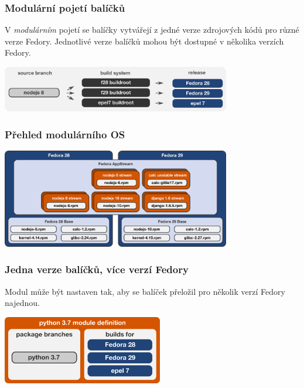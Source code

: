 \documentclass[12pt]{beamer}
\begin{document}
\begin{frame}
\frametitle{Modulární pojetí balíčků}
V \textit{modulárním} pojetí se balíčky vytvářejí z jedné verze zdrojových kódů pro různé verze Fedory. Jednotlivé verze balíčků mohou být dostupné v několika verzích Fedory.
\begin{center}
	\includegraphics[width=10cm]{modular}
\end{center}
\end{frame}

\begin{frame}
\frametitle{Přehled modulárního OS}

\begin{center}
	\includegraphics[width=10cm]{overview}
\end{center}
\end{frame}

\begin{frame}
\frametitle{Jedna verze balíčků, více verzí Fedory}
Modul může být nastaven tak, aby se balíček přeložil pro několik verzí Fedory najednou. 

\begin{center}
	\includegraphics[width=7cm]{forversion}
\end{center}
\end{frame}
\end{document}

